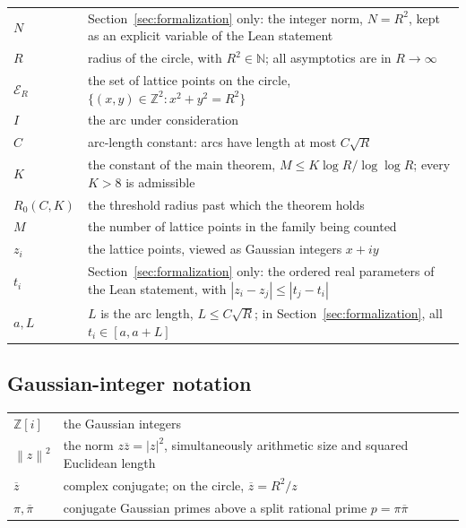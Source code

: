 \documentclass[11pt]{article}
\newcommand{\Z}{\mathbb Z}
\newcommand{\N}{\mathbb N}
\newcommand{\GI}{\mathbb Z[i]}
\newcommand{\Norm}[1]{\left\lVert#1\right\rVert^2}
\newcommand{\conj}[1]{\overline{#1}}
\newcommand{\E}{\mathcal E}
\begin{document}
\begin{center}
\begin{tabular}{@{}lp{}@{}}
\(N\) & Section~\ref{sec:formalization} only: the integer norm, \(N=R^2\), kept as an explicit variable of the Lean statement \\
\(R\) & radius of the circle, with \(R^2\in\N\); all asymptotics are in \(R\to\infty\) \\
\(\E_R\) & the set of lattice points on the circle, \(\{(x,y)\in\Z^2 : x^2+y^2=R^2\}\) \\
\(I\) & the arc under consideration \\
\(C\) & arc-length constant: arcs have length at most \(C\sqrt R\) \\
\(K\) & the constant of the main theorem, \(M\le K\log R/\log\log R\); every \(K>8\) is admissible \\
\(R_0(C,K)\) & the threshold radius past which the theorem holds \\
\(M\) & the number of lattice points in the family being counted \\
\(z_i\) & the lattice points, viewed as Gaussian integers \(x+iy\) \\
\(t_i\) & Section~\ref{sec:formalization} only: the ordered real parameters of the Lean statement, with \(|z_i-z_j|\le|t_j-t_i|\) \\
\(a,L\) & \(L\) is the arc length, \(L\le C\sqrt R\); in Section~\ref{sec:formalization}, all \(t_i\in[a,a+L]\)
\end{tabular}
\end{center}

\subsection*{Gaussian-integer notation}

\begin{center}
\begin{tabular}{@{}lp{}@{}}
\(\GI\) & the Gaussian integers \\
\(\Norm{z}\) & the norm \(z\conj z=|z|^2\), simultaneously arithmetic size and squared Euclidean length \\
\(\conj z\) & complex conjugate; on the circle, \(\conj z=R^2/z\) \\
\(\pi,\conj\pi\) & conjugate Gaussian primes above a split rational prime \(p=\pi\conj\pi\)
\end{tabular}
\end{center}
\end{document}
